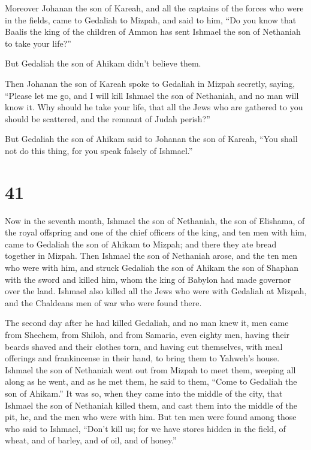  Moreover Johanan the son of Kareah, and all the captains
of the forces who were in the fields, came to Gedaliah to Mizpah,
 and said to him, ``Do you know that Baalis the king of the
children of Ammon has sent Ishmael the son of Nethaniah to take your
life?''

But Gedaliah the son of Ahikam didn't believe them.

 Then Johanan the son of Kareah spoke to Gedaliah in Mizpah
secretly, saying, ``Please let me go, and I will kill Ishmael the son of
Nethaniah, and no man will know it. Why should he take your life, that
all the Jews who are gathered to you should be scattered, and the
remnant of Judah perish?''

 But Gedaliah the son of Ahikam said to Johanan the son of
Kareah, ``You shall not do this thing, for you speak falsely of
Ishmael.''

\hypertarget{section-40}{%
\section{41}\label{section-40}}

 Now in the seventh month, Ishmael the son of Nethaniah, the
son of Elishama, of the royal offspring and one of the chief officers of
the king, and ten men with him, came to Gedaliah the son of Ahikam to
Mizpah; and there they ate bread together in Mizpah.  Then
Ishmael the son of Nethaniah arose, and the ten men who were with him,
and struck Gedaliah the son of Ahikam the son of Shaphan with the sword
and killed him, whom the king of Babylon had made governor over the
land.  Ishmael also killed all the Jews who were with
Gedaliah at Mizpah, and the Chaldeans men of war who were found there.

 The second day after he had killed Gedaliah, and no man
knew it,  men came from Shechem, from Shiloh, and from
Samaria, even eighty men, having their beards shaved and their clothes
torn, and having cut themselves, with meal offerings and frankincense in
their hand, to bring them to Yahweh's house.  Ishmael the
son of Nethaniah went out from Mizpah to meet them, weeping all along as
he went, and as he met them, he said to them, ``Come to Gedaliah the son
of Ahikam.''  It was so, when they came into the middle of
the city, that Ishmael the son of Nethaniah killed them, and cast them
into the middle of the pit, he, and the men who were with him.
 But ten men were found among those who said to Ishmael,
``Don't kill us; for we have stores hidden in the field, of wheat, and
of barley, and of oil, and of honey.''

